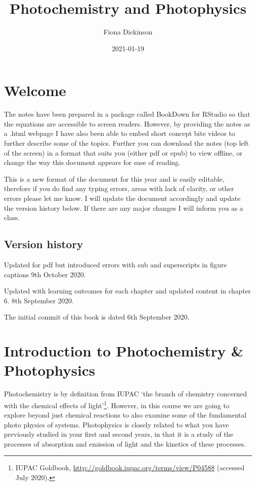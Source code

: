 \documentclass[
]{book}
\title{Photochemistry and Photophysics}
\author{Fiona Dickinson}
\date{2021-01-19}
\begin{document}
\maketitle

{
\setcounter{tocdepth}{1}
\tableofcontents
}
\hypertarget{welcome}{%
\chapter*{Welcome}\label{welcome}}

The notes have been prepared in a package called BookDown for RStudio so that the equations are accessible to screen readers. However, by providing the notes as a .html webpage I have also been able to embed short concept bite videos to further describe some of the topics. Further you can download the notes (top left of the screen) in a format that suits you (either pdf or epub) to view offline, or change the way this document appears for ease of reading.

This is a new format of the document for this year and is easily editable, therefore if you do find any typing errors, areas with lack of clarity, or other errors please let me know. I will update the document accordingly and update the version history below. If there are any major changes I will inform you as a class.

\hypertarget{version-history}{%
\section*{Version history}\label{version-history}}

Updated for pdf but introduced errors with sub and superscripts in figure captions 9th October 2020.

Updated with learning outcomes for each chapter and updated content in chapter 6. 8th September 2020.

The initial commit of this book is dated 6th September 2020.

\hypertarget{ch:Intro}{%
\chapter{Introduction to Photochemistry \& Photophysics}\label{ch:Intro}}

Photochemistry is by definition from IUPAC `the branch of chemistry concerned with the chemical effects of light'\footnote{IUPAC Goldbook, \url{http://goldbook.iupac.org/terms/view/P04588} (accessed July 2020).}. However, in this course we are going to explore beyond just chemical reactions to also examine some of the fundamental photo physics of systems. Photophysics is closely related to what you have previously studied in your first and second years, in that it is a study of the processes of absorption and emission of light and the kinetics of these processes.
\end{document}
